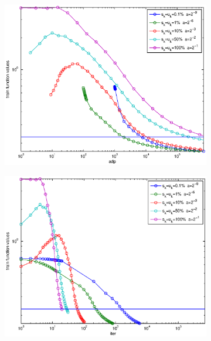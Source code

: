 \documentclass[12pt]{article}
\begin{document}
\begin{figure}[H]
\begin{subfigure}[b]{.5\linewidth}
	        \includegraphics[width=4in]{Figures/exp2-1.eps}
\end{subfigure}%
\begin{subfigure}[b]{.5\linewidth}
	        \includegraphics[width=4in]{Figures/exp2-2.eps}
\end{subfigure}%


\end{figure}
\end{document}
